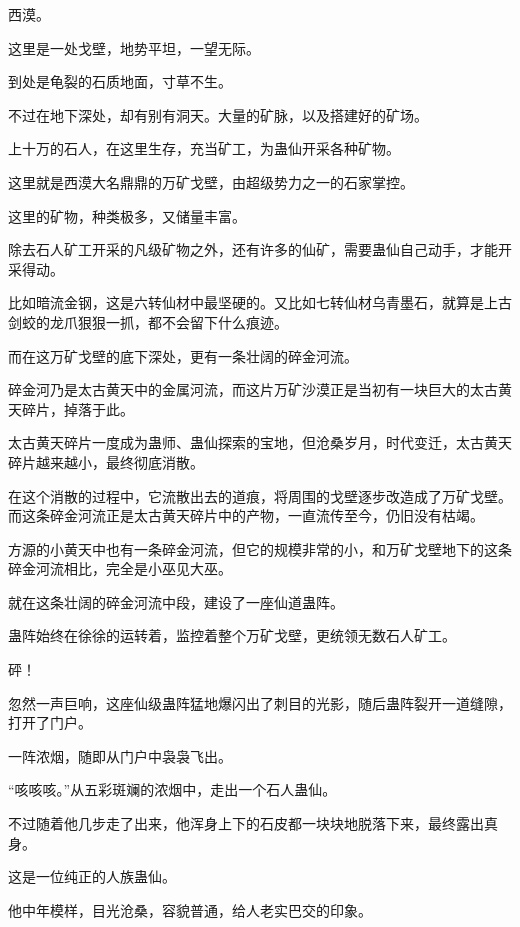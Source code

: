 
\begin{this_body}



西漠。

这里是一处戈壁，地势平坦，一望无际。

到处是龟裂的石质地面，寸草不生。

不过在地下深处，却有别有洞天。大量的矿脉，以及搭建好的矿场。

上十万的石人，在这里生存，充当矿工，为蛊仙开采各种矿物。

这里就是西漠大名鼎鼎的万矿戈壁，由超级势力之一的石家掌控。

这里的矿物，种类极多，又储量丰富。

除去石人矿工开采的凡级矿物之外，还有许多的仙矿，需要蛊仙自己动手，才能开采得动。

比如暗流金钢，这是六转仙材中最坚硬的。又比如七转仙材乌青墨石，就算是上古剑蛟的龙爪狠狠一抓，都不会留下什么痕迹。

而在这万矿戈壁的底下深处，更有一条壮阔的碎金河流。

碎金河乃是太古黄天中的金属河流，而这片万矿沙漠正是当初有一块巨大的太古黄天碎片，掉落于此。

太古黄天碎片一度成为蛊师、蛊仙探索的宝地，但沧桑岁月，时代变迁，太古黄天碎片越来越小，最终彻底消散。

在这个消散的过程中，它流散出去的道痕，将周围的戈壁逐步改造成了万矿戈壁。而这条碎金河流正是太古黄天碎片中的产物，一直流传至今，仍旧没有枯竭。

方源的小黄天中也有一条碎金河流，但它的规模非常的小，和万矿戈壁地下的这条碎金河流相比，完全是小巫见大巫。

就在这条壮阔的碎金河流中段，建设了一座仙道蛊阵。

蛊阵始终在徐徐的运转着，监控着整个万矿戈壁，更统领无数石人矿工。

砰！

忽然一声巨响，这座仙级蛊阵猛地爆闪出了刺目的光影，随后蛊阵裂开一道缝隙，打开了门户。

一阵浓烟，随即从门户中袅袅飞出。

“咳咳咳。”从五彩斑斓的浓烟中，走出一个石人蛊仙。

不过随着他几步走了出来，他浑身上下的石皮都一块块地脱落下来，最终露出真身。

这是一位纯正的人族蛊仙。

他中年模样，目光沧桑，容貌普通，给人老实巴交的印象。


\end{this_body}
